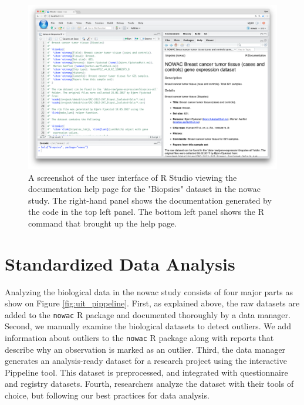 \begin{figure}
  \includegraphics[width=\linewidth]{figures/rpkg.png}
    \caption[A screenshot of the user interface of R Studio.]{A screenshot of
    the user interface of R Studio viewing the documentation help page for the
    "Biopsies" dataset in the \gls{nowac} study.  The right-hand panel shows the
    documentation generated by the code in the top left panel. The bottom left
    panel shows the R command that brought up the help page.}
    \label{rpkgfig} 
\end{figure}

\section{Standardized Data Analysis}
Analyzing the biological data in the \gls{nowac} study consists of four major
parts as show on Figure \ref{fig:uit_pippeline}. First, as explained above, the
raw datasets are added to the \texttt{nowac} R package and documented thoroughly
by a data manager.  Second, we manually examine the biological datasets to
detect outliers. We add information about outliers to the \texttt{nowac} R
package along with reports that describe why an observation is marked as an
outlier.  Third, the data manager generates an analysis-ready dataset for a
research project using the interactive Pippeline tool. This dataset is
preprocessed, and integrated with questionnaire and registry datasets. Fourth,
researchers analyze the dataset with their tools of choice, but following
our best practices for data analysis.

